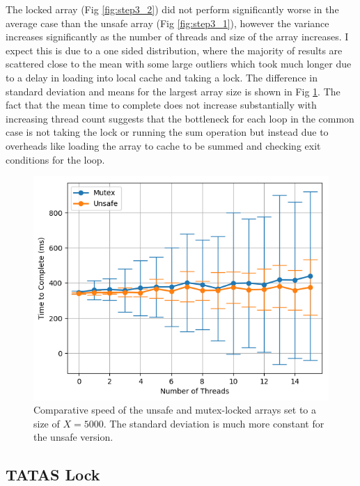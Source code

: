 \documentclass[11pt]{article}
\begin{document}
The locked array (Fig \ref{fig:step3_2}) did not perform significantly worse in the average case than the unsafe array (Fig \ref{fig:step3_1}),
however the variance increases significantly as the number of threads and size of the array increases. I expect this is due to a one sided distribution, where the majority of results are scattered close to the mean with some large outliers which took much longer due to a delay in loading into local cache and taking a lock. The difference in standard deviation and means for the largest array size is shown in Fig \ref{fig:step3_3}. The fact that the mean time to complete does not increase substantially with increasing thread count suggests that the bottleneck for each loop in the common case is not taking the lock or running the sum operation but instead due to overheads like loading the array to cache to be summed and checking exit conditions for the loop.


\begin{figure}\label{fig:step3_3}
\centering
\includegraphics[scale=0.65]{step3_3.png}
\caption{Comparative speed of the unsafe and mutex-locked arrays set to a size of $X=5000$. The standard deviation is much more constant for the unsafe version.}
\end{figure}


\subsection{TATAS Lock}
\end{document}
